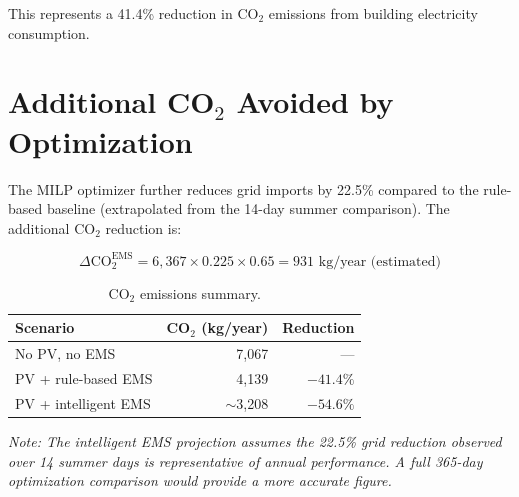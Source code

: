 This represents a 41.4\% reduction in CO$_2$ emissions from building electricity consumption.

\section{Additional CO$_2$ Avoided by Optimization}

The MILP optimizer further reduces grid imports by 22.5\% compared to the rule-based baseline (extrapolated from the 14-day summer comparison). The additional CO$_2$ reduction is:

\begin{equation}
    \Delta\text{CO}_2^{\text{EMS}} = 6{,}367 \times 0.225 \times 0.65 = 931 \text{ kg/year (estimated)}
\end{equation}

\begin{table}[H]
\centering
\caption{CO$_2$ emissions summary.}
\begin{tabular}{lrr}
\toprule
\textbf{Scenario} & \textbf{CO$_2$ (kg/year)} & \textbf{Reduction} \\
\midrule
No PV, no EMS & 7,067 & --- \\
PV + rule-based EMS & 4,139 & $-41.4\%$ \\
PV + intelligent EMS & $\sim$3,208 & $-54.6\%$ \\
\bottomrule
\end{tabular}
\end{table}

\textit{Note: The intelligent EMS projection assumes the 22.5\% grid reduction observed over 14 summer days is representative of annual performance. A full 365-day optimization comparison would provide a more accurate figure.}
